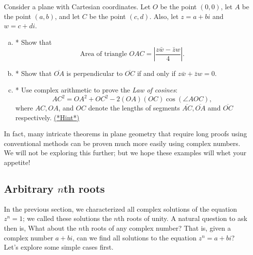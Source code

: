 {\begin{exercise}{57}
Consider a plane with Cartesian coordinates. Let $O$ be the point $(0,0)$, let $A$ be the point $(a,b)$, and let $C$ be the point $(c,d)$. Also, let $z = a+bi$ and $w = c+di$.
\begin{enumerate}[(a)]
\item
*  Show that 
\[
\text{Area of triangle }OAC = \left| \frac{z \bar{w} - \bar{z} w}{4} \right|. \]
\item
* Show that $\overline{OA}$ is perpendicular to $\overline{OC}$ if and only if $z \bar{w} + \bar{z} w = 0$.
\item
* Use complex arithmetic to prove the \emph{Law of cosines}:
\[ AC^2 = OA^2 + OC^2 - 2(OA)(OC)\cos(\angle AOC),\]
where $AC,OA$, and $OC$ denote the lengths of segments $\overline{AC}, \overline{OA}$ amd $\overline{OC}$ respectively. 
\hyperref[sec:complex:hints]{(*Hint*)}

\end{enumerate}
\end{exercise}

In fact, many intricate theorems in plane geometry that require long proofs using conventional methods can be proven much more easily using complex numbers. We will not be exploring this further; but we hope these examples will whet your appetite!


\subsection{Arbitrary $n$th roots}
In the previous section, we characterized all complex solutions of the equation $z^n = 1$; we called these solutions the $n$th roots of unity. A natural question to ask then is, What about the $n$th roots of any complex number? That is, given a complex number $a + bi$, can we find all solutions to the equation $z^n = a + bi$? Let's explore some simple cases first.

}
